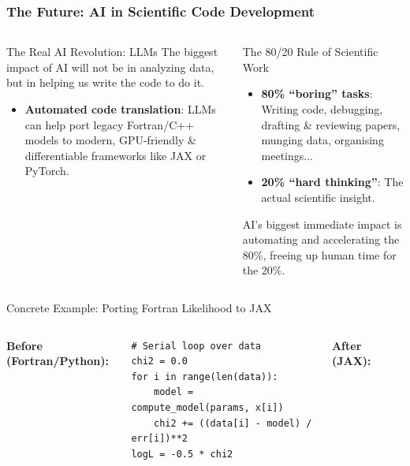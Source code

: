 \documentclass[aspectratio=169]{beamer}
\begin{document}
\begin{frame}[fragile]
    \frametitle{The Future: AI in Scientific Code Development}
    \vspace{-1em}
    \begin{columns}[T]
        \begin{block}{The Real AI Revolution: LLMs}
            The biggest impact of AI will not be in analyzing data, but in helping us write the code to do it.
            \begin{itemize}
                \item \textbf{Automated code translation}: LLMs can help port legacy Fortran/C++ models to modern, GPU-friendly \& differentiable frameworks like JAX or PyTorch.
            \end{itemize}
        \end{block}
        \begin{block}{The 80/20 Rule of Scientific Work}
            \begin{itemize}
                \item \textbf{80\% ``boring'' tasks}: Writing code, debugging, drafting \& reviewing papers, munging data, organising meetings...
                \item \textbf{20\% ``hard thinking''}: The actual scientific insight.
            \end{itemize}
            AI's biggest immediate impact is automating and accelerating the 80\%, freeing up human time for the 20\%.
        \end{block}
    \end{columns}
    \vspace{-0.5em}
    \begin{exampleblock}{Concrete Example: Porting Fortran Likelihood to JAX}
        \small
        \begin{columns}[T]
            \textbf{Before (Fortran/Python):}
            \tiny
            \begin{verbatim}
# Serial loop over data
chi2 = 0.0
for i in range(len(data)):
    model = compute_model(params, x[i])
    chi2 += ((data[i] - model) / err[i])**2
logL = -0.5 * chi2
            \end{verbatim}
            \textbf{After (JAX):}
            \tiny
            \begin{verbatim}

\end{verbatim}
\end{columns}
\end{exampleblock}
\end{frame}
\end{document}

